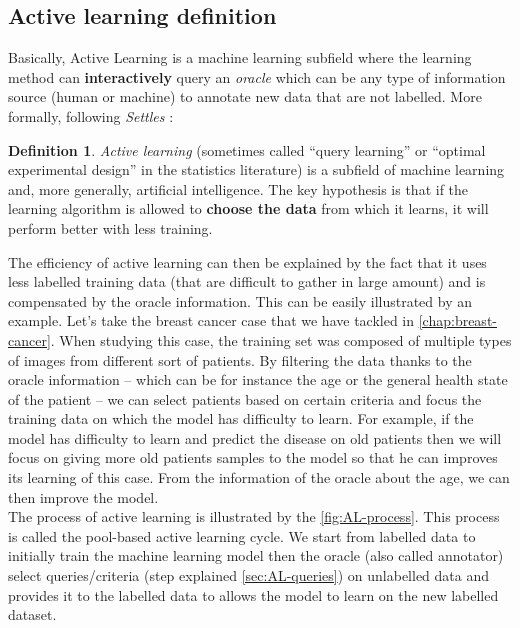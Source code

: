 \documentclass[11pt, openany]{report}
\theoremstyle{plain}
\theoremstyle{definition}
\newtheorem{defn}{Definition}[section]
\theoremstyle{remark}
\begin{document}
\subsection{Active learning definition}
Basically, Active Learning is a machine learning subfield where the learning method can \textbf{interactively} query an \textit{oracle} which can be any type of information source (human or machine) to annotate new data that are not labelled. More formally, following \textit{Settles} \cite{AL-Survey}: 

\begin{defn}
\textit{Active learning} (sometimes called “query learning” or “optimal experimental design” in the statistics literature) is a subfield of machine learning and, more generally, artificial intelligence. The key hypothesis is that if the learning algorithm is allowed to \textbf{choose the data} from which it learns, it will perform better with less training. \cite{AL-Survey}
\end{defn} 

The efficiency of active learning can then be explained by the fact that it uses less labelled training data (that are difficult to gather in large amount) and is compensated by the oracle information. This can be easily illustrated by an example. Let's take the breast cancer case that we have tackled in \autoref{chap:breast-cancer}. When studying this case, the training set was composed of multiple types of images from different sort of patients. By filtering the data thanks to the oracle information -- which can be for instance the age or the general health state of the patient -- we can select patients based on certain criteria and focus the training data on which the model has difficulty to learn. For example, if the model has difficulty to learn and predict the disease on old patients then we will focus on giving more old patients samples to the model so that he can improves its learning of this case. From the information of the oracle about the age, we can then improve the model.   \\

The process of active learning is illustrated by the \autoref{fig:AL-process}. This process is called the pool-based active learning cycle. We start from labelled data to initially train the machine learning model then the oracle (also called annotator) select queries/criteria (step explained \autoref{sec:AL-queries}) on unlabelled data and provides it to the labelled data to allows the model to learn on the new labelled dataset.    
\end{document}
